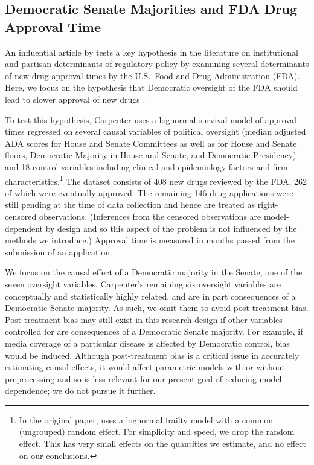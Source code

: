 \documentclass[11pt,titlepage]{article}
\begin{document}
\subsection{Democratic Senate Majorities and FDA Drug Approval
  Time}\label{s:carp}

An influential article by \citet{Carpenter02} tests a key hypothesis in the
literature on institutional and partisan determinants of regulatory
policy by examining several determinants of new drug approval times by
the U.S.\ Food and Drug Administration (FDA).  Here, we focus on the
hypothesis that Democratic oversight of the FDA should lead to slower
approval of new drugs \citep[p.495 and Model 1 of Table 2,
p.499]{Carpenter02}.

To test this hypothesis, Carpenter uses a lognormal survival model of
approval times regressed on several causal variables of political
oversight (median adjusted ADA scores for House and Senate Committees
as well as for House and Senate floors, Democratic Majority in House
and Senate, and Democratic Presidency) and 18 control variables
including clinical and epidemiology factors and firm
characteristics.\footnote{In the original paper, \citet{Carpenter02} uses a
  lognormal frailty model with a common (ungrouped) random effect.
  For simplicity and speed, we drop the random effect.  This has very
  small effects on the quantities we estimate, and no effect on our
  conclusions.}  The dataset consists of 408 new drugs reviewed by the
FDA, 262 of which were eventually approved.  The remaining 146 drug
applications were still pending at the time of data collection and
hence are treated as right-censored observations.  (Inferences from
the censored observations are model-dependent by design and so this
aspect of the problem is not influenced by the methods we introduce.)
Approval time is measured in months passed from the submission of an
application.

We focus on the causal effect of a Democratic majority in the Senate,
one of the seven oversight variables.  Carpenter's remaining six
oversight variables are conceptually and statistically highly related,
and are in part consequences of a Democratic Senate majority.  As
such, we omit them to avoid post-treatment bias.  Post-treatment bias
may still exist in this research design if other variables controlled
for are consequences of a Democratic Senate majority.  For example, if
media coverage of a particular disease is affected by Democratic
control, bias would be induced.  Although post-treatment bias is a
critical issue in accurately estimating causal effects, it would
affect parametric models with or without preprocessing and so is less
relevant for our present goal of reducing model dependence;
we do not pursue it further.
\end{document}
